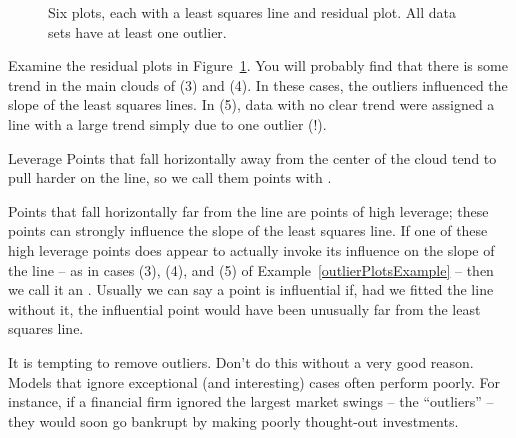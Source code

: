 \begin{figure}
  \centering
  \caption{Six plots, each with a least squares line and
      residual plot. All data sets have at least one outlier.}
\label{outlierPlots}
\end{figure}

Examine the residual plots in Figure~\ref{outlierPlots}. You will probably find that there is some trend in the main clouds of (3) and (4). In these cases, the outliers influenced the slope of the least squares lines. In (5), data with no clear trend were assigned a line with a large trend simply due to one outlier (!).
 
 \begin{onebox}{Leverage}
Points that fall horizontally away from the center of the cloud tend to pull harder on the line, so we call them points with .
\end{onebox}

Points that fall horizontally far from the line are points of high leverage; these points can strongly influence the slope of the least squares line. If one of these high leverage points does appear to actually invoke its influence on the slope of the line -- as in cases (3), (4), and (5) of Example~\ref{outlierPlotsExample} -- then we call it an . Usually we can say a point is influential if, had we fitted the line without it, the influential point would have been unusually far from the least squares line.

It is tempting to remove outliers. Don't do this without a very good reason. Models that ignore exceptional (and interesting) cases often perform poorly. For instance, if a financial firm ignored the largest market swings -- the ``outliers'' --  they would soon go bankrupt by making poorly thought-out investments.

%


